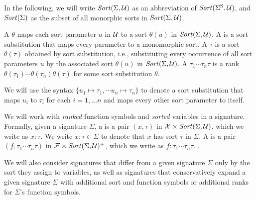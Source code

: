 \begin{newver}
\begin{notation}
In the following, we will write $\mathit{Sort}(\Sigma, \mathcal{U})$ as an abbreviation 
of $\mathit{Sort}(\Sigma^\mathrm{S}, \mathcal{U})$, and $\mathit{Sort}(\Sigma)$ as the subset of all 
monorphic sorts in $\mathit{Sort}(\Sigma, \mathcal{U})$.
\end{notation}

\begin{definition}
A  $\theta$
maps each sort parameter $u$ in $\mathcal{U}$ to a sort $\theta(u)$ in $\mathit{Sort}(\Sigma,\mathcal{U})$.
A  is a sort substitution that maps every parameter
to a monomorphic sort.
A  $\tau$ is a sort $\theta(\tau)$ obtained
by sort substitution, i.e.,
substituting every occurrence of all sort parameters $u$ by the associated sort
$\theta(u)$ in $\mathit{Sort}(\Sigma,\mathcal{U})$.
A  $\tau_1\cdots\tau_n \tau$ is a rank
$\theta(\tau_1)\cdots\theta(\tau_n)\theta(\tau)$ for some sort substitution
$\theta$.
\end{definition}
We will use the syntax $\{u_1 \mapsto \tau_1, \cdots u_n \mapsto \tau_n \}$
to denote a sort substitution that maps $u_i$ to $\tau_i$ for each $i=1,\dots n$
and maps every other sort parameter to itself.
\end{newver}

We will work with \emph{ranked} function symbols and \emph{sorted} variables
in a signature.
Formally,
given a signature $\Sigma$,
a  is 
a pair $(x,\tau)$ in $\mathcal{X} \times \mathit{Sort}(\Sigma, \mathcal{U})$,
which we write as $x{:}\tau$.
We write $x{:}\tau \in \Sigma$
to denote that $x$ has sort $\tau$ in $\Sigma$.
A  is 
a pair $(f, \tau_1\cdots\tau_n\tau)$ in $\mathcal{F} \times \mathit{Sort}(\Sigma, \mathcal{U})^+$,
which we write as $f{:}\tau_1\cdots\tau_n\tau$.
.

We will also consider signatures that differ from a given signature $\Sigma$
only by the sort they assign to variables,
as well as signatures that conservatively expand a given signature $\Sigma$
with additional sort and function symbols or additional ranks 
for $\Sigma$'s function symbols.

